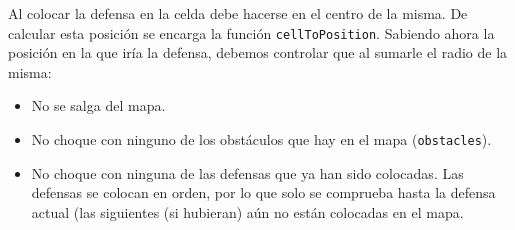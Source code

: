 Al colocar la defensa en la celda debe hacerse en el centro de la misma. De calcular esta posici\'on se encarga la funci\'on \texttt{cellToPosition}. Sabiendo ahora la posici\'on en la que ir\'ia la defensa, debemos controlar que al sumarle el radio de la misma:
 \begin{itemize}
	\item No se salga del mapa.
	\item No choque con ninguno de los obst\'aculos que hay en el mapa
 (\texttt{obstacles}).
 	\item No choque con ninguna de las defensas que ya han sido colocadas. Las defensas se colocan en orden, por lo que solo se comprueba hasta la defensa actual (las siguientes (si hubieran) a\'un no est\'an colocadas en el mapa. 
\end{itemize}





